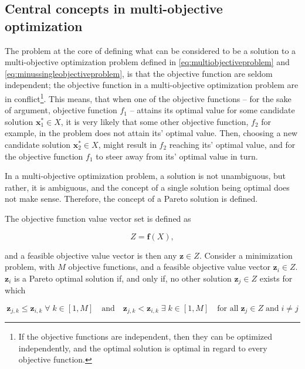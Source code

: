 \subsection{Central concepts in multi-objective optimization}
\label{multiconcepts}
The problem at the core of defining what can be considered to be a solution to a multi-objective optimization problem defined in
\eqref{eq:multiobjectiveproblem} and \eqref{eq:minussingleobjectiveproblem}, is that the objective function are seldom independent; the
objective function in a multi-objective optimization problem are in conflict\footnote{If the objective functions are
independent, then they can be optimized independently, and the optimal solution is optimal in regard to every objective function.}. This
means, that when one of the objective functions -- for the sake of argument, objective function $f_1$ -- 
attains its optimal value for some candidate solution $\mathbf{x}^*_1 \in X$,
it is very likely that some other objective function, $f_2$ for example, in the problem
does not attain its' optimal value. Then, choosing a new candidate solution $\mathbf{x}^*_2 \in X$, might result in $f_2$ reaching its'
optimal value, and for the objective function $f_1$ to steer away from its' optimal value in turn.

In a multi-objective optimization problem, a solution is not unambiguous, but rather, it is ambiguous, and the
concept of a single solution being optimal does not make sense. Therefore, the concept of a Pareto 
solution is defined.

The objective function value vector set is defined as

\begin{equation}
    \label{eq:objectivevalspace}
    Z = \mathbf{f}(X),
\end{equation}

and a feasible objective value vector is then any $\mathbf{z} \in Z$. Consider a
minimization problem, with $M$ objective functions,
and a feasible objective value vector $\mathbf{z}_i \in Z$.
$\mathbf{z}_i$  is a Pareto optimal solution if, and only if, no other solution $\mathbf{z}_j \in Z$
exists for which

\begin{equation}
    \label{eq:paretodef}
    \mathbf{z}_{j,k} \leq \mathbf{z}_{i,k}\;\forall\;k \in [1, M]
    \quad\text{and}\quad
    \mathbf{z}_{j,k} < \mathbf{z}_{i,k}\;\exists\;k \in [1, M]
    \quad\text{for all}\;\mathbf{z}_j\in Z \;\text{and}\; i\neq j
\end{equation}

